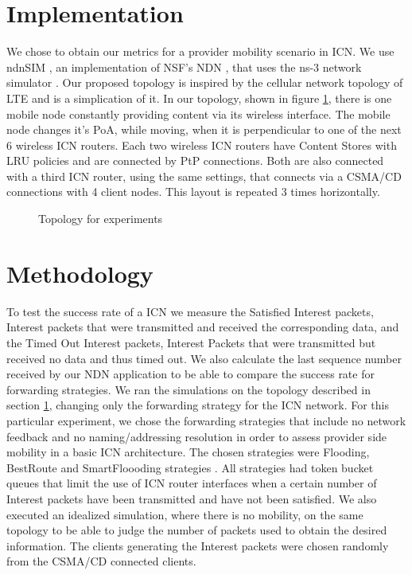 \documentclass[twocolumn, a4paper]{ieicejsp}
\begin{document}

\section{Implementation}
\label{sec:implementation}
We chose to obtain our metrics for a provider mobility scenario in ICN. We use 
ndnSIM \cite{ndn367}, an implementation of NSF's NDN \cite{nsfndn:2014:Online},
that uses the ns-3 network simulator \cite{ns3:2014:Online}. Our proposed 
topology is inspired by the cellular network topology of LTE \cite{sesia2011lte} and
is a simplication of it. In our topology, shown in figure \ref{fig:exptop}, there
is one mobile node constantly providing content via its wireless interface. The
mobile node changes it's PoA, while moving, when it is perpendicular to one of
the next 6 wireless ICN routers. Each two wireless ICN routers have Content
Stores with LRU policies and are connected by PtP connections. Both are also
connected with a third ICN router, using the same settings, that connects via a
CSMA/CD connections with 4 client nodes. This layout is repeated 3 times horizontally. 

\begin{figure}[h]
\centering
\caption{Topology for experiments}
\label{fig:exptop}
\end{figure}

\section{Methodology}
To test the success rate of a ICN we measure the Satisfied Interest packets,
Interest packets that were transmitted and received the corresponding data, and
the Timed Out Interest packets, Interest Packets that were transmitted but
received no data and thus timed out. We also calculate the last sequence number
received by our NDN application to be able to compare the success rate for 
forwarding strategies. We ran the simulations on the topology described in
section \ref{sec:implementation}, changing only the forwarding strategy for
the ICN network. For this particular experiment, we chose the forwarding
strategies that include no network feedback and no naming/addressing resolution 
in order to assess provider side mobility in a basic ICN architecture. The
chosen strategies were Flooding, BestRoute and SmartFloooding strategies
\cite{ndn367}. All strategies had token bucket queues that limit the use of
ICN router interfaces when a certain number of Interest packets have been
transmitted and have not been satisfied. We also executed an idealized
simulation, where there is no mobility, on the same topology to be able to
judge the number of packets used to obtain the desired information. The clients 
generating the Interest packets were chosen randomly from the CSMA/CD connected
clients.
\end{document}
